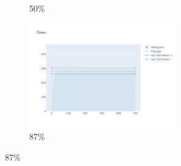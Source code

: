 \documentclass[12pt, fleqn]{report}                             %
\theoremstyle{break}                                            %
\begin{document}
\begin{figure}[h!]
\begin{subfigure}[b]{0.4\linewidth}
            \caption{50\%}
          \end{subfigure}
          \begin{subfigure}[b]{0.4\linewidth}
            \includegraphics[width=0.7\textwidth]{Images/110/dia-d.png}
            \caption{87\%}
          \end{subfigure}
        \end{figure}
\end{document}
